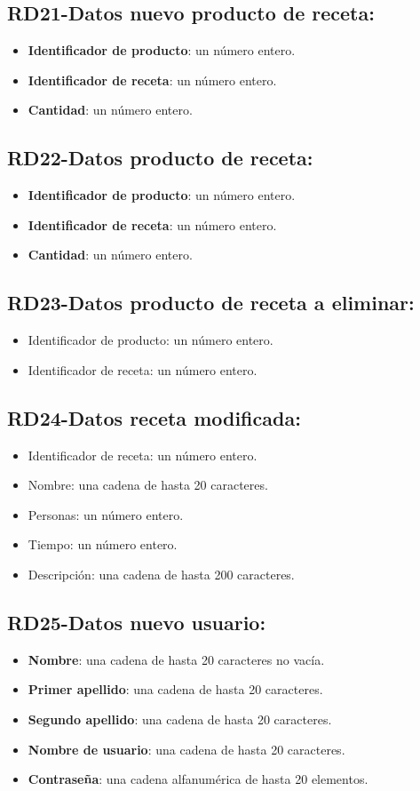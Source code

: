 \documentclass[a4paper,12pt]{report}
\begin{document}
\subsection{RD21-Datos nuevo producto de receta:}
\label{sec-2-1-21}
\begin{itemize}
\item \textbf{Identificador de producto}: un número entero.
\item \textbf{Identificador de receta}: un número entero.
\item \textbf{Cantidad}: un número entero.
\end{itemize}
\subsection{RD22-Datos producto de receta:}
\label{sec-2-1-22}
\begin{itemize}
\item \textbf{Identificador de producto}: un número entero.
\item \textbf{Identificador de receta}: un número entero.
\item \textbf{Cantidad}: un número entero.
\end{itemize}
\subsection{RD23-Datos producto de receta a eliminar:}
\label{sec-2-1-23}
\begin{itemize}
\item Identificador de producto: un número entero.
\item Identificador de receta: un número entero.
\end{itemize}
\subsection{RD24-Datos receta modificada:}
\label{sec-2-1-24}
\begin{itemize}
\item Identificador de receta: un número entero.
\item Nombre: una cadena de hasta 20 caracteres.
\item Personas: un número entero.
\item Tiempo: un número entero.
\item Descripción: una cadena de hasta 200 caracteres.
\end{itemize}
\subsection{RD25-Datos nuevo usuario:}
\label{sec-2-1-25}
\begin{itemize}
\item \textbf{Nombre}: una cadena de hasta 20 caracteres no vacía.
\item \textbf{Primer apellido}: una cadena de hasta 20 caracteres.
\item \textbf{Segundo apellido}: una cadena de hasta 20 caracteres.
\item \textbf{Nombre de usuario}: una cadena de hasta 20 caracteres.
\item \textbf{Contraseña}: una cadena alfanumérica de hasta 20 elementos.
\end{itemize}
\end{document}
